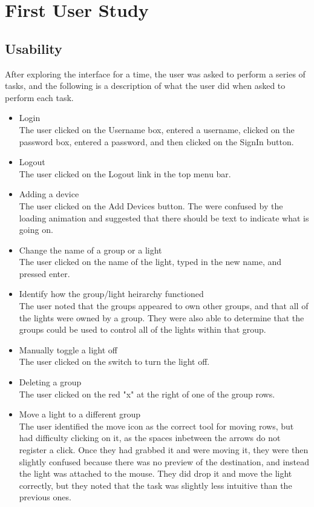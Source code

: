 \documentclass[oneside,openright]{book}
\begin{document}
\section{First User Study}
\subsection{Usability}
After exploring the interface for a time, the user was asked to perform a series of tasks, and the following is a description of what the user did when asked to perform each task.
\begin{itemize}
  \item Login \\
    The user clicked on the Username box, entered a username, clicked on the password box, entered a password, and then clicked on the SignIn button.
  \item Logout \\
    The user clicked on the Logout link in the top menu bar.
  \item Adding a device \\
    The user clicked on the Add Devices button. The were confused by the loading animation and suggested that there should be text to indicate what is going on.
  \item Change the name of a group or a light \\
    The user clicked on the name of the light, typed in the new name, and pressed enter.
  \item Identify how the group/light heirarchy functioned \\
    The user noted that the groups appeared to own other groups, and that all of the lights were owned by a group. They were also able to determine that the groups could be used to control all of the lights within that group.
  \item Manually toggle a light off \\
    The user clicked on the switch to turn the light off.
  \item Deleting a group \\
    The user clicked on the red "x" at the right of one of the group rows.
  \item Move a light to a different group \\
    The user identified the move icon as the correct tool for moving rows, but had difficulty clicking on it, as the spaces inbetween the arrows do not register a click. Once they had grabbed it and were moving it, they were then slightly confused because there was no preview of the destination, and instead the light was attached to the mouse. They did drop it and move the light correctly, but they noted that the task was slightly less intuitive than the previous ones.

\end{itemize}
\end{document}
